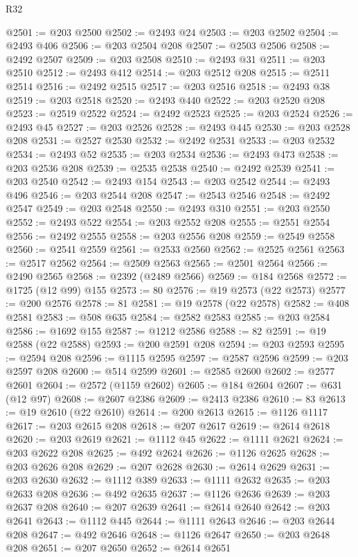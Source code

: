 \begin{lexlean}{R32}
\begin{coremodule}
@2501 := @203 @2500
@2502 := @2493 @24
@2503 := @203 @2502
@2504 := @2493 @406
@2506 := @203 @2504 @208
@2507 := @2503 @2506
@2508 := @2492 @2507
@2509 := @203 @2508
@2510 := @2493 @31
@2511 := @203 @2510
@2512 := @2493 @412
@2514 := @203 @2512 @208
@2515 := @2511 @2514
@2516 := @2492 @2515
@2517 := @203 @2516
@2518 := @2493 @38
@2519 := @203 @2518
@2520 := @2493 @440
@2522 := @203 @2520 @208
@2523 := @2519 @2522
@2524 := @2492 @2523
@2525 := @203 @2524
@2526 := @2493 @45
@2527 := @203 @2526
@2528 := @2493 @445
@2530 := @203 @2528 @208
@2531 := @2527 @2530
@2532 := @2492 @2531
@2533 := @203 @2532
@2534 := @2493 @52
@2535 := @203 @2534
@2536 := @2493 @473
@2538 := @203 @2536 @208
@2539 := @2535 @2538
@2540 := @2492 @2539
@2541 := @203 @2540
@2542 := @2493 @154
@2543 := @203 @2542
@2544 := @2493 @496
@2546 := @203 @2544 @208
@2547 := @2543 @2546
@2548 := @2492 @2547
@2549 := @203 @2548
@2550 := @2493 @310
@2551 := @203 @2550
@2552 := @2493 @522
@2554 := @203 @2552 @208
@2555 := @2551 @2554
@2556 := @2492 @2555
@2558 := @203 @2556 @208
@2559 := @2549 @2558
@2560 := @2541 @2559
@2561 := @2533 @2560
@2562 := @2525 @2561
@2563 := @2517 @2562
@2564 := @2509 @2563
@2565 := @2501 @2564
@2566 := @2490 @2565
@2568 := @2392 (@2489 @2566)
@2569 := @184 @2568
@2572 := @1725 (@12 @99) @155
@2573 := 80
@2576 := @19 @2573 (@22 @2573)
@2577 := @200 @2576
@2578 := 81
@2581 := @19 @2578 (@22 @2578)
@2582 := @408 @2581
@2583 := @508 @635
@2584 := @2582 @2583
@2585 := @203 @2584
@2586 := @1692 @155
@2587 := @1212 @2586
@2588 := 82
@2591 := @19 @2588 (@22 @2588)
@2593 := @200 @2591 @208
@2594 := @203 @2593
@2595 := @2594 @208
@2596 := @1115 @2595
@2597 := @2587 @2596
@2599 := @203 @2597 @208
@2600 := @514 @2599
@2601 := @2585 @2600
@2602 := @2577 @2601
@2604 := @2572 (@1159 @2602)
@2605 := @184 @2604
@2607 := @631 (@12 @97)
@2608 := @2607 @2386
@2609 := @2413 @2386
@2610 := 83
@2613 := @19 @2610 (@22 @2610)
@2614 := @200 @2613
@2615 := @1126 @1117
@2617 := @203 @2615 @208
@2618 := @207 @2617
@2619 := @2614 @2618
@2620 := @203 @2619
@2621 := @1112 @45
@2622 := @1111 @2621
@2624 := @203 @2622 @208
@2625 := @492 @2624
@2626 := @1126 @2625
@2628 := @203 @2626 @208
@2629 := @207 @2628
@2630 := @2614 @2629
@2631 := @203 @2630
@2632 := @1112 @389
@2633 := @1111 @2632
@2635 := @203 @2633 @208
@2636 := @492 @2635
@2637 := @1126 @2636
@2639 := @203 @2637 @208
@2640 := @207 @2639
@2641 := @2614 @2640
@2642 := @203 @2641
@2643 := @1112 @445
@2644 := @1111 @2643
@2646 := @203 @2644 @208
@2647 := @492 @2646
@2648 := @1126 @2647
@2650 := @203 @2648 @208
@2651 := @207 @2650
@2652 := @2614 @2651

\end{coremodule}
\end{lexlean}
